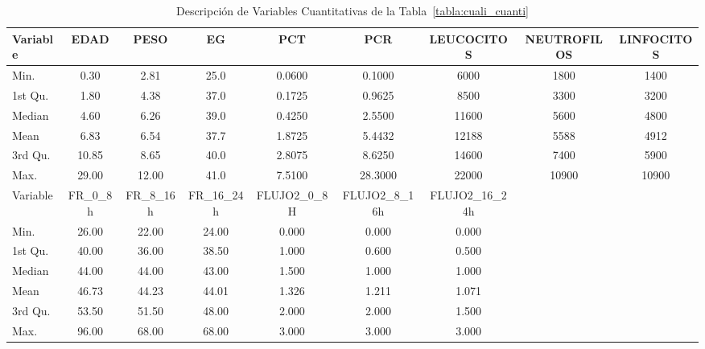 \newpage
\thispagestyle{empty}
\begin{landscape}
    \begin{table}[h]
        \centering
        \caption{Descripción de Variables Cuantitativas de la Tabla~\ref{tabla:cuali_cuanti}}
        \begin{tabular}{lcccccccc}
        \hline
        Variable & EDAD & PESO & EG & PCT & PCR & LEUCOCITOS & NEUTROFILOS & LINFOCITOS \\ \hline
        Min. & 0.30 & 2.81 & 25.0 & 0.0600 & 0.1000 & 6000 & 1800 & 1400 \\
        1st Qu. & 1.80 & 4.38 & 37.0 & 0.1725 & 0.9625 & 8500 & 3300 & 3200 \\
        Median & 4.60 & 6.26 & 39.0 & 0.4250 & 2.5500 & 11600 & 5600 & 4800 \\
        Mean & 6.83 & 6.54 & 37.7 & 1.8725 & 5.4432 & 12188 & 5588 & 4912 \\
        3rd Qu. & 10.85 & 8.65 & 40.0 & 2.8075 & 8.6250 & 14600 & 7400 & 5900 \\
        Max. & 29.00 & 12.00 & 41.0 & 7.5100 & 28.3000 & 22000 & 10900 & 10900 \\ \hline
        Variable & FR\_0\_8h & FR\_8\_16h & FR\_16\_24h & FLUJO2\_0\_8H & FLUJO2\_8\_16h & FLUJO2\_16\_24h \\ \hline
        Min. & 26.00 & 22.00 & 24.00 & 0.000 & 0.000 & 0.000 \\
        1st Qu. & 40.00 & 36.00 & 38.50 & 1.000 & 0.600 & 0.500 \\
        Median & 44.00 & 44.00 & 43.00 & 1.500 & 1.000 & 1.000 \\
        Mean & 46.73 & 44.23 & 44.01 & 1.326 & 1.211 & 1.071 \\
        3rd Qu. & 53.50 & 51.50 & 48.00 & 2.000 & 2.000 & 1.500 \\
        Max. & 96.00 & 68.00 & 68.00 & 3.000 & 3.000 & 3.000 \\ \hline
        \end{tabular}
        \label{tab:datos_descripcion_cuantitativos}
    \end{table}
\end{landscape}
\restoregeometry 
    
